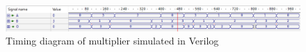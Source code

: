 \begin{figure}[H]
    \centering
    \includegraphics[width=\textwidth]{Figures/Test of multiplier.png}
    \caption{Timing diagram of multiplier simulated in Verilog}
    \label{fig:multiplier_sim}
\end{figure}




